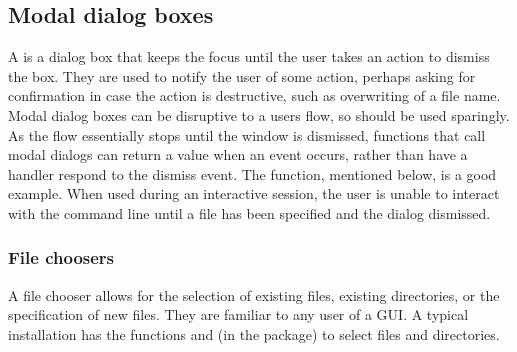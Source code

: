 







\subsection{Modal dialog boxes}
\label{sec:GUI:modal-dialogs}

A  is a dialog box that keeps the focus until
the user takes an action to dismiss the box. They are used to notify
the user of some action, perhaps asking for confirmation in case the
action is destructive, such as overwriting of a file name. Modal
dialog boxes can be disruptive to a users flow, so should be used
sparingly. As the flow essentially stops until the window is
dismissed, functions that call modal dialogs can return a value when
an event occurs, rather than have a handler respond to the dismiss
event. The  function, mentioned below, is a good
example. When used during an interactive \R\/ session, the user is
unable to interact with the command line until a file has been
specified and the dialog dismissed. 


\subsubsection{File choosers}
\label{sec:GUI:file-choosers}

A file chooser allows for the selection of existing files, existing
directories, or the specification of new files. They are familiar to
any user of a GUI. A typical \R\/ installation has the functions
 and  (in the
 package) to select files and directories.


